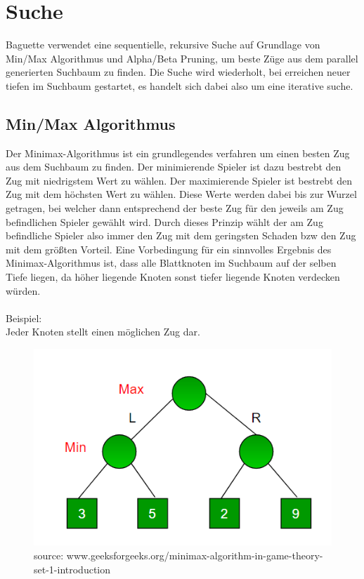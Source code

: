 \documentclass[12pt,a4paper]{article}
\begin{document}
\lstset{language=Java}
\section{Suche}\label{search}
Baguette verwendet eine sequentielle, rekursive Suche auf Grundlage von Min/Max Algorithmus und Alpha/Beta Pruning, um beste Züge aus dem parallel generierten Suchbaum zu finden.
Die Suche wird wiederholt, bei erreichen neuer tiefen im Suchbaum gestartet, es handelt sich dabei also um eine iterative suche.

\subsection{Min/Max Algorithmus}
Der Minimax-Algorithmus ist ein grundlegendes verfahren um einen besten Zug aus dem Suchbaum zu finden. Der minimierende Spieler ist dazu bestrebt den Zug mit niedrigstem Wert zu wählen. Der maximierende Spieler ist bestrebt den Zug mit dem höchsten Wert zu wählen.
Diese Werte werden dabei bis zur Wurzel getragen, bei welcher dann entsprechend der beste Zug für den jeweils am Zug befindlichen Spieler gewählt wird. Durch dieses Prinzip wählt der am Zug befindliche Spieler also immer den Zug mit dem geringsten Schaden bzw den Zug mit dem größten Vorteil. Eine Vorbedingung für ein sinnvolles Ergebnis des Minimax-Algorithmus ist, dass alle Blattknoten im Suchbaum auf der selben Tiefe liegen, da höher liegende Knoten sonst tiefer liegende Knoten verdecken würden.  
\\\\
Beispiel:\\Jeder Knoten stellt einen möglichen Zug dar.
\begin{figure}[h]
\begin{center}
\includegraphics[scale=0.5]{minmax.png}
\caption{source: www.geeksforgeeks.org/minimax-algorithm-in-game-theory-set-1-introduction}
\end{center}
\end{figure}
\end{document}
